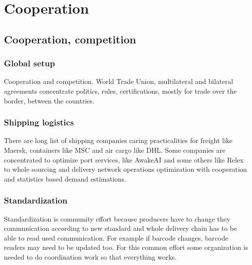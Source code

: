 %
%
%

\part{Cooperation}
\label{cooperation}

\chapter{Cooperation, competition}
\label{cooperation_competition}

\section{Global setup}
\label{global_setup}
Cooperation and competition.
World Trade Union\cite{WTO}, multilateral\cite{Multilateral} and
bilateral\cite{Bilateral} agreements concentrate politics, rules,
certifications, mostly for trade over the border, between the countries.

\section{Shipping logistics}
\label{shipping_logistics}
There are long list of shipping companies caring practicalities for freight
like Maersk\cite{FreightShipping}, containers like MSC\cite{ContainerShipping}
and air cargo like DHL\cite{CargoAirlines}. Some companies are concentrated to
optimize port services, like AwakeAI\cite{AwakeAI} and some others like
Relex\cite{Relex} to whole sourcing and delivery network operations optimization
with cooperation and statistics based demand estimations.

\section{Standardization}
\label{standardization}
Standardization is community effort because producers have to change they
communication according to new standard and whole delivery chain has to be able
to read used communication. For example if barcode changes, barcode readers may
need to be updated too. For this common effort some organization is needed to
do coordination work so that everything works.

